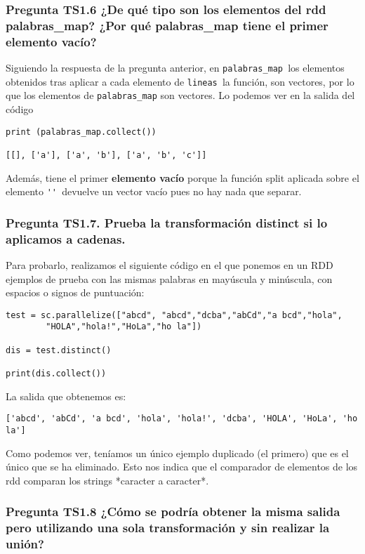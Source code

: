 \documentclass[11pt]{article}
\def\inline{\lstinline[basicstyle=\ttfamily,keywordstyle={}]}
\begin{document}
{{\subsubsection*{ Pregunta TS1.6 ¿De qué tipo son los elementos del rdd palabras\_map? ¿Por qué palabras\_map tiene el primer elemento vacío?}

Siguiendo la respuesta de la pregunta anterior, en \inline{palabras_map }los elementos obtenidos tras aplicar a cada elemento de  \inline{lineas }la función, son vectores, por lo que los elementos de \inline{palabras_map} son vectores.  Lo podemos ver en la salida del código

\begin{verbatim}
print (palabras_map.collect())

[[], ['a'], ['a', 'b'], ['a', 'b', 'c']]
\end{verbatim}

Además, tiene el primer \textbf{elemento vacío} porque la función split aplicada sobre el elemento \inline{'' }devuelve un vector vacío pues no hay nada que separar.


\subsubsection*{ Pregunta TS1.7. Prueba la transformación distinct si lo aplicamos a cadenas.}

Para probarlo, realizamos el siguiente código en el que ponemos en un RDD ejemplos de prueba con las mismas palabras en mayúscula y minúscula, con espacios o signos de puntuación:

\begin{verbatim}
test = sc.parallelize(["abcd", "abcd","dcba","abCd","a bcd","hola",
        "HOLA","hola!","HoLa","ho la"])

dis = test.distinct()

print(dis.collect())
\end{verbatim}
La salida que obtenemos es:

\begin{verbatim}
['abcd', 'abCd', 'a bcd', 'hola', 'hola!', 'dcba', 'HOLA', 'HoLa', 'ho la']
\end{verbatim}

Como podemos ver, teníamos un único ejemplo duplicado (el primero) que es el único que se ha eliminado. Esto nos indica que el comparador de elementos de los rdd comparan los strings *caracter a caracter*.

\subsubsection*{ Pregunta TS1.8 ¿Cómo se podría obtener la misma salida pero utilizando una sola transformación y sin realizar la unión?}


}}
\end{document}
